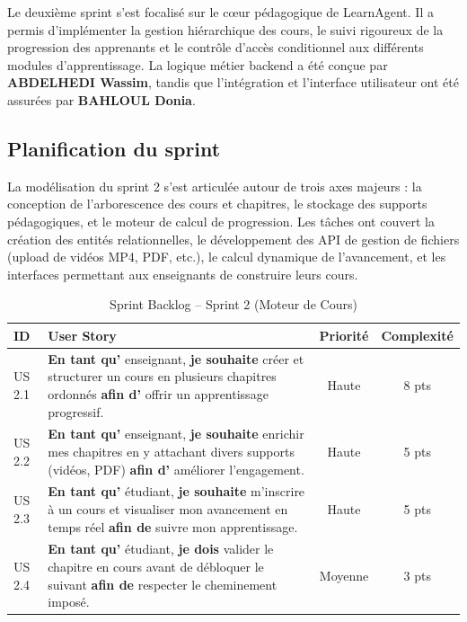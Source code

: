 \documentclass[12pt,a4paper]{report}
\begin{document}
Le deuxième sprint s'est focalisé sur le cœur pédagogique de LearnAgent. Il a permis d'implémenter la gestion hiérarchique des cours, le suivi rigoureux de la progression des apprenants et le contrôle d’accès conditionnel aux différents modules d'apprentissage. La logique métier backend a été conçue par \textbf{ABDELHEDI Wassim}, tandis que l'intégration et l'interface utilisateur ont été assurées par \textbf{BAHLOUL Donia}.

\subsection{Planification du sprint}

La modélisation du sprint 2 s’est articulée autour de trois axes majeurs : la conception de l'arborescence des cours et chapitres, le stockage des supports pédagogiques, et le moteur de calcul de progression. Les tâches ont couvert la création des entités relationnelles, le développement des API de gestion de fichiers (upload de vidéos MP4, PDF, etc.), le calcul dynamique de l'avancement, et les interfaces permettant aux enseignants de construire leurs cours.

\vspace{0.5cm}
\begin{table}[H]
\centering
\renewcommand{\arraystretch}{1.4}
\caption{Sprint Backlog -- Sprint 2 (Moteur de Cours)}
\vspace{0.2cm}
\begin{tabularx}{\textwidth}{l X c c}
\toprule
\textbf{ID} & \textbf{User Story} & \textbf{Priorité} & \textbf{Complexité} \\
\midrule
US 2.1 & \textbf{En tant qu'} enseignant, \textbf{je souhaite} créer et structurer un cours en plusieurs chapitres ordonnés \textbf{afin d'} offrir un apprentissage progressif. & Haute & 8 pts \\
US 2.2 & \textbf{En tant qu'} enseignant, \textbf{je souhaite} enrichir mes chapitres en y attachant divers supports (vidéos, PDF) \textbf{afin d'} améliorer l'engagement. & Haute & 5 pts \\
US 2.3 & \textbf{En tant qu'} étudiant, \textbf{je souhaite} m'inscrire à un cours et visualiser mon avancement en temps réel \textbf{afin de} suivre mon apprentissage. & Haute & 5 pts \\
US 2.4 & \textbf{En tant qu'} étudiant, \textbf{je dois} valider le chapitre en cours avant de débloquer le suivant \textbf{afin de} respecter le cheminement imposé. & Moyenne & 3 pts \\
\bottomrule
\end{tabularx}
\end{table}
\end{document}
